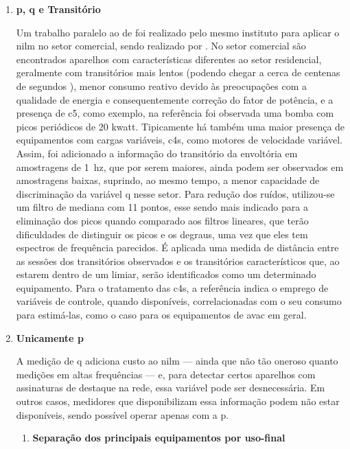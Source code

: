 \begin{enumerate}[label=\textbf{1.\arabic*},wide=\parindent]
\item \textbf{\Acrlong{p}, \Acrlong{q} e Transitório}
\label{nilm:pot_real_trans}

Um trabalho paralelo ao de \citeauthor*{nilm_hart_1992_8} foi
realizado pelo mesmo instituto para aplicar o \gls{nilm} no setor
comercial, sendo realizado por
\citet*{nilm_norford_leeb_medianfilt_1996_13}. No setor comercial
são encontrados aparelhos com características diferentes ao setor
residencial, geralmente com transitórios mais lentos (podendo chegar a
cerca de centenas de segundos
\cite{nilm_norford_leeb_medianfilt_1996_13}), menor consumo reativo
devido às preocupações com a qualidade de energia e consequentemente
correção do fator de potência, e a presença de \gls{c5}, como exemplo,
na referência foi observada uma bomba com picos periódicos de 20
k\acrshort{watt}. Tipicamente há também uma maior presença de
equipamentos com cargas variáveis, \glspl{c4}, como motores de velocidade
variável. Assim, foi adicionado a informação do transitório da
envoltória em amostragens de 1~\acrshort{hz}, que por serem maiores,
ainda podem ser observados em amostragens baixas, suprindo, ao mesmo
tempo, a menor capacidade de discriminação da variável \gls{q} nesse
setor. Para redução dos ruídos, utilizou-se um filtro de mediana
com 11 pontos, esse sendo mais indicado para a eliminação dos picos
quando comparado aos filtros lineares, que terão dificuldades de
distinguir os picos e os degraus, uma vez que eles tem espectros de
frequência parecidos. É aplicada uma medida de distância entre as
sessões dos transitórios observados e os transitórios característicos
que, ao estarem dentro de um limiar, serão identificados como um
determinado equipamento.  Para o tratamento das \glspl{c4}, a
referência indica o emprego de variáveis de controle, quando
disponíveis, correlacionadas com o seu consumo para estimá-las, como o
caso para os equipamentos de \gls{avac} em geral.

\item \textbf{Unicamente \acrlong{p}}
\label{nilm:pot_real}

A medição de \acrlong{q} adiciona custo ao \gls{nilm} --- ainda que
não tão oneroso quanto medições em altas frequências --- e, para
detectar certos aparelhos com assinaturas de destaque na rede,
essa variável pode ser desnecessária. Em outros casos, medidores que
disponibilizam essa informação podem não estar disponíveis, sendo
possível operar apenas com a \acrlong{p}.

\begin{enumerate}[label*=.\textbf{\arabic*},wide=\parindent]
\item \textbf{Separação dos principais equipamentos por uso-final}


\end{enumerate}
\end{enumerate}
